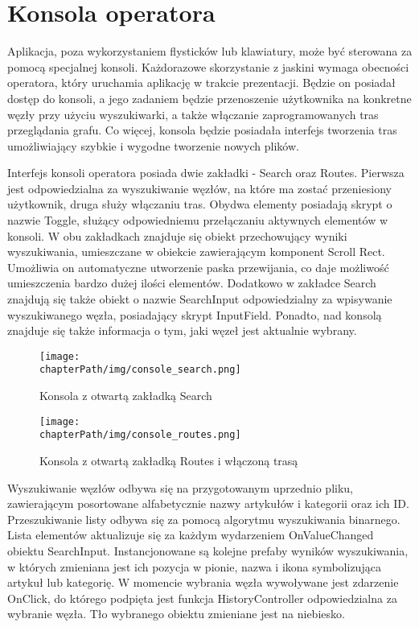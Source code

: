 \section{Konsola operatora}
Aplikacja, poza wykorzystaniem flysticków lub klawiatury, może być sterowana za pomocą specjalnej konsoli. Każdorazowe skorzystanie z jaskini wymaga obecności operatora, który uruchamia aplikację w trakcie prezentacji. Będzie on posiadał dostęp do konsoli, a jego zadaniem będzie przenoszenie użytkownika na konkretne węzły przy użyciu wyszukiwarki, a także włączanie zaprogramowanych tras przeglądania grafu. Co więcej, konsola będzie posiadała interfejs tworzenia tras umożliwiający szybkie i wygodne tworzenie nowych plików. 

Interfejs konsoli operatora posiada dwie zakładki - Search oraz Routes. Pierwsza jest odpowiedzialna za wyszukiwanie węzłów, na które ma zostać przeniesiony użytkownik, druga służy włączaniu tras. Obydwa elementy posiadają skrypt o nazwie Toggle, służący odpowiedniemu przełączaniu aktywnych elementów w konsoli. W obu zakładkach znajduje się obiekt przechowujący wyniki wyszukiwania, umieszczane w obiekcie zawierającym komponent Scroll Rect. Umożliwia on automatyczne utworzenie paska przewijania, co daje możliwość umieszczenia bardzo dużej ilości elementów.  Dodatkowo w zakładce Search znajdują się także obiekt o nazwie SearchInput odpowiedzialny za wpisywanie wyszukiwanego węzła, posiadający skrypt InputField. Ponadto, nad konsolą znajduje się także informacja o tym, jaki węzeł jest aktualnie wybrany.

\begin{figure}[!h]
    \begin{minipage}[c]{0.5\linewidth}
        \texttt{[image: \\chapterPath/img/console\_search.png]}
        \caption{\small Konsola z otwartą zakładką Search}
        \label{fig:page-map}
    \end{minipage}
    \begin{minipage}[c]{0.5\linewidth}
        \texttt{[image: \\chapterPath/img/console\_routes.png]}
        \caption{\small Konsola z otwartą zakładką Routes i włączoną trasą}
        \label{fig:pagelinks-map}
    \end{minipage}
\end{figure}

Wyszukiwanie węzłów odbywa się na przygotowanym uprzednio pliku, zawierającym posortowane alfabetycznie nazwy artykułów i kategorii oraz ich ID. Przeszukiwanie listy odbywa się za pomocą algorytmu wyszukiwania binarnego. Lista elementów aktualizuje się za każdym wydarzeniem OnValueChanged obiektu SearchInput. Instancjonowane są kolejne prefaby wyników wyszukiwania, w których zmieniana jest ich pozycja w pionie, nazwa i ikona symbolizująca artykuł lub kategorię. W momencie wybrania węzła wywoływane jest zdarzenie OnClick, do którego podpięta jest funkcja HistoryController odpowiedzialna za wybranie węzła. Tło wybranego obiektu zmieniane jest na niebiesko.

